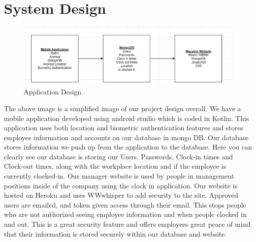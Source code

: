 \chapter{System Design}
\begin{figure}[h]
    \includegraphics[width=1\textwidth]{img/design.png}
    \caption{Application Design.}
    \label{fig}
\end{figure}
The above image is a simplified image of our project design overall. We have a mobile application developed using android studio which is coded in Kotlin. This application uses both location and biometric authentication features and stores employee information and accounts on our database in mongo DB. Our database stores information we push up from the application to the database. Here you can clearly see our database is storing our Users, Passwords, Clock-in times and Clock-out times, along with the workplace location and if the employee is currently clocked-in.
Our manager website is used by people in management positions inside of the company using the clock in application. Our website is hosted on Heroku and uses WWwhisper to add security to the site. Approved users are emailed, and token given access through their email. This stops people who are not authorized seeing employee information and when people clocked in and out. This is a great security feature and offers employees great peace of mind that their information is stored securely within our database and website.
\\
